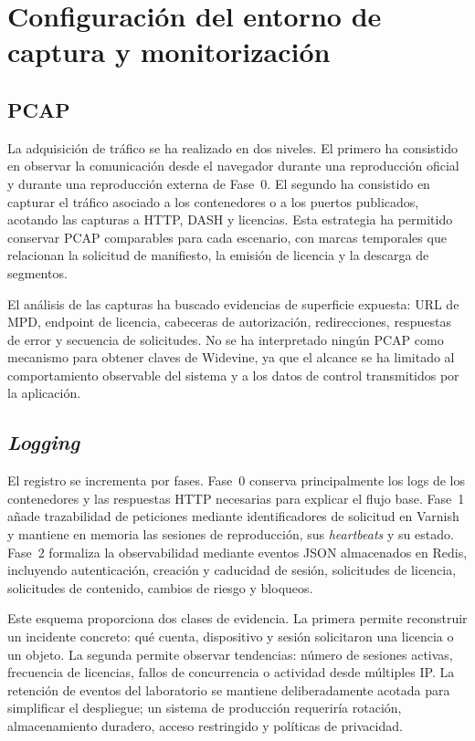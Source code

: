 \section{Configuración del entorno de captura y monitorización}

\subsection{PCAP}

La adquisición de tráfico se ha realizado en dos niveles. El primero ha consistido en observar la comunicación desde el navegador durante una reproducción oficial y durante una reproducción externa de Fase~0. El segundo ha consistido en capturar el tráfico asociado a los contenedores o a los puertos publicados, acotando las capturas a HTTP, DASH y licencias. Esta estrategia ha permitido conservar PCAP comparables para cada escenario, con marcas temporales que relacionan la solicitud de manifiesto, la emisión de licencia y la descarga de segmentos.

El análisis de las capturas ha buscado evidencias de superficie expuesta: URL de MPD, endpoint de licencia, cabeceras de autorización, redirecciones, respuestas de error y secuencia de solicitudes. No se ha interpretado ningún PCAP como mecanismo para obtener claves de Widevine, ya que el alcance se ha limitado al comportamiento observable del sistema y a los datos de control transmitidos por la aplicación.

\subsection{\textit{Logging}}

El registro se incrementa por fases. Fase~0 conserva principalmente los logs de los contenedores y las respuestas HTTP necesarias para explicar el flujo base. Fase~1 añade trazabilidad de peticiones mediante identificadores de solicitud en Varnish y mantiene en memoria las sesiones de reproducción, sus \textit{heartbeats} y su estado. Fase~2 formaliza la observabilidad mediante eventos JSON almacenados en Redis, incluyendo autenticación, creación y caducidad de sesión, solicitudes de licencia, solicitudes de contenido, cambios de riesgo y bloqueos.

Este esquema proporciona dos clases de evidencia. La primera permite reconstruir un incidente concreto: qué cuenta, dispositivo y sesión solicitaron una licencia o un objeto. La segunda permite observar tendencias: número de sesiones activas, frecuencia de licencias, fallos de concurrencia o actividad desde múltiples IP. La retención de eventos del laboratorio se mantiene deliberadamente acotada para simplificar el despliegue; un sistema de producción requeriría rotación, almacenamiento duradero, acceso restringido y políticas de privacidad.

